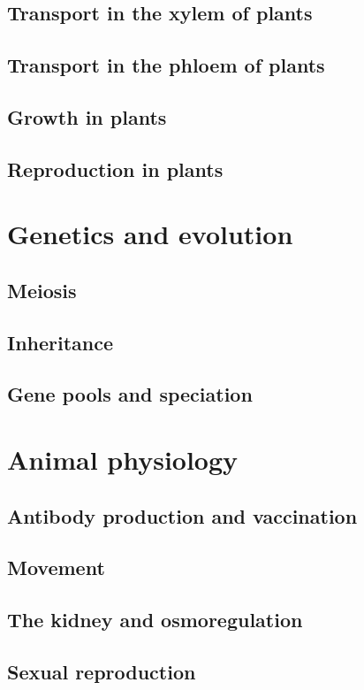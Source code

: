 \documentclass[12pt, a4paper]{article}
\begin{document}
\subsection{Transport in the xylem of plants}

\subsection{Transport in the phloem of plants}

\subsection{Growth in plants}

\subsection{Reproduction in plants}


\newpage
\section{Genetics and evolution}
\subsection{Meiosis}

\subsection{Inheritance}

\subsection{Gene pools and speciation}


\newpage
\section{Animal physiology}
\subsection{Antibody production and vaccination}

\subsection{Movement}

\subsection{The kidney and osmoregulation}

\subsection{Sexual reproduction}
\end{document}
